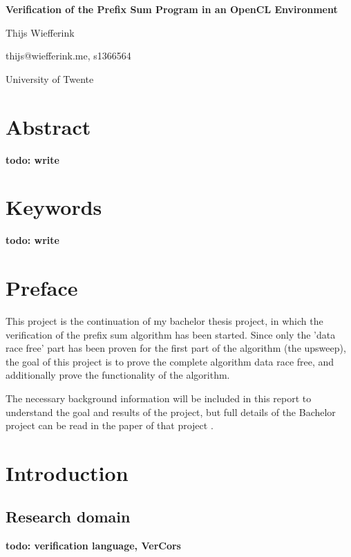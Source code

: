 \documentclass[a4paper]{article}
\newcommand{\todo}[1]{{\color{BurntOrange}\sffamily\textbf{todo: #1}\par}}
\begin{document}
\begin{titlepage}
	\begin{center}
		{\huge\bfseries Verification of the Prefix Sum Program in an OpenCL Environment\par}
		
		\vspace{1cm}
		{\LARGE Thijs Wiefferink\par}
		{\large thijs@wiefferink.me, s1366564}
		
		\vfill
		
		{\Large
			University of Twente		
		}
	\end{center}

\end{titlepage}
\newpage


\section*{Abstract}
\todo{write}


\section*{Keywords}
\todo{write}


\section*{Preface}
This project is the continuation of my bachelor thesis project, in which the verification of the prefix sum algorithm has been started. Since only the 'data race free' part has been proven for the first part of the algorithm (the upsweep), the goal of this project is to prove the complete algorithm data race free, and additionally prove the functionality of the algorithm.

The necessary background information will be included in this report to understand the goal and results of the project, but full details of the Bachelor project can be read in the paper of that project \cite{bachelorThesis}.


\newpage
\tableofcontents


\section{Introduction}

\subsection{Research domain}
\todo{verification language, VerCors}
\end{document}
